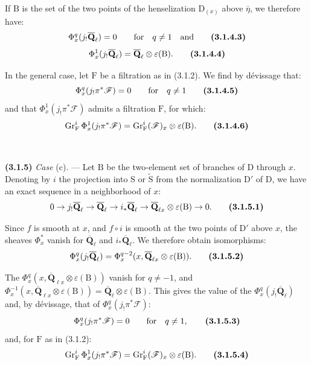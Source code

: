 \documentclass[11pt,leqno]{article}
\newcommand{\Page}[1]{\ifvmode\noindent\else\unskip\ \fi{\footnotesize\textcolor{gray}{[p.\,#1]}}\ \ignorespaces}
\begin{document}
If \(\mathrm B\) is the set of the two points of the henselization \(\mathrm D_{(x)}\) above \(\bar{\eta}\), we therefore have:
\[
\Phi_x^q(j_!\overline{\mathbf Q}_\ell)=0
\qquad\text{for}\quad q\ne1
\quad\text{and}
\tag*{\textbf{(3.1.4.3)}}
\]
\[
\Phi_x^1(j_!\overline{\mathbf Q}_\ell)
=\overline{\mathbf Q}_\ell\otimes\varepsilon(\mathrm B).
\tag*{\textbf{(3.1.4.4)}}
\]

In the general case, let \(\mathrm F\) be a filtration as in (3.1.2). We find by dévissage that:
\[
\Phi_x^q(j_!\pi^*\mathscr F)=0
\qquad\text{for}\quad q\ne1
\tag*{\textbf{(3.1.4.5)}}
\]
and that \(\Phi_x^1(j_!\pi^*\mathscr F)\) admits a filtration \(\mathrm F\), for which:
\[
\operatorname{Gr}_{\mathrm F}^i\Phi_x^1(j_!\pi^*\mathscr F)
=\operatorname{Gr}_{\mathrm F}^i(\mathscr F)_x\otimes\varepsilon(\mathrm B).
\tag*{\textbf{(3.1.4.6)}}
\]

\Page{200}

\textbf{(3.1.5)} \textit{Case} (c). — Let \(\mathrm B\) be the two-element set of branches of \(\mathrm D\) through \(x\). Denoting by \(i\) the projection into \(\mathrm S\) or \(\widetilde{\mathrm S}\) from the normalization \(\mathrm D'\) of \(\mathrm D\), we have an exact sequence in a neighborhood of \(x\):
\[
0\to j_!\overline{\mathbf Q}_\ell
\to\overline{\mathbf Q}_\ell
\to i_*\overline{\mathbf Q}_\ell
\to\overline{\mathbf Q}_{\ell x}\otimes\varepsilon(\mathrm B)
\to0.
\tag*{\textbf{(3.1.5.1)}}
\]

Since \(f\) is smooth at \(x\), and \(f\circ i\) is smooth at the two points of \(\mathrm D'\) above \(x\), the sheaves \(\Phi_x^*\) vanish for \(\overline{\mathbf Q}_\ell\) and \(i_*\overline{\mathbf Q}_\ell\). We therefore obtain isomorphisms:
\[
\Phi_x^q(j_!\overline{\mathbf Q}_\ell)
=\Phi_x^{q-2}(x,\overline{\mathbf Q}_{\ell x}\otimes\varepsilon(\mathrm B)).
\tag*{\textbf{(3.1.5.2)}}
\]

The \(\Phi_x^q(x,\overline{\mathbf Q}_{\ell x}\otimes\varepsilon(\mathrm B))\) vanish for \(q\ne-1\), and \(\Phi_x^{-1}(x,\overline{\mathbf Q}_{\ell x}\otimes\varepsilon(\mathrm B))=\overline{\mathbf Q}_\ell\otimes\varepsilon(\mathrm B)\). This gives the value of the \(\Phi_x^q(j_!\overline{\mathbf Q}_\ell)\) and, by dévissage, that of \(\Phi_x^q(j_!\pi^*\mathscr F)\):
\[
\Phi_x^q(j_!\pi^*\mathscr F)=0
\qquad\text{for}\quad q\ne1,
\tag*{\textbf{(3.1.5.3)}}
\]
and, for \(\mathrm F\) as in (3.1.2):
\[
\operatorname{Gr}_{\mathrm F}^i\Phi_x^1(j_!\pi^*\mathscr F)
=\operatorname{Gr}_{\mathrm F}^i(\mathscr F)_x\otimes\varepsilon(\mathrm B).
\tag*{\textbf{(3.1.5.4)}}
\]
\end{document}
